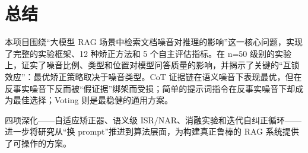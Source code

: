 \documentclass[UTF8,zihao=-4]{ctexart}
\begin{document}
\section{总结}

本项目围绕“大模型 RAG 场景中检索文档噪音对推理的影响”这一核心问题，实现了完整的实验框架、12 种矫正方法和 5 个自主评估指标。在 n=50 级别的实验上，证实了噪音比例、类型和位置对模型问答质量的影响，并揭示了关键的“互锁效应”：最优矫正策略取决于噪音类型。CoT 证据链在语义噪音下表现最优，但在反事实噪音下反而被“假证据”绑架而受损；简单的提示词指令在反事实噪音下却成为最佳选择；Voting 则是最稳健的通用方案。

四项深化——自适应矫正器、语义级 ISR/NAR、消融实验和迭代自纠正循环——进一步将研究从“换 prompt”推进到算法层面，为构建真正鲁棒的 RAG 系统提供了可操作的方案。
\end{document}
